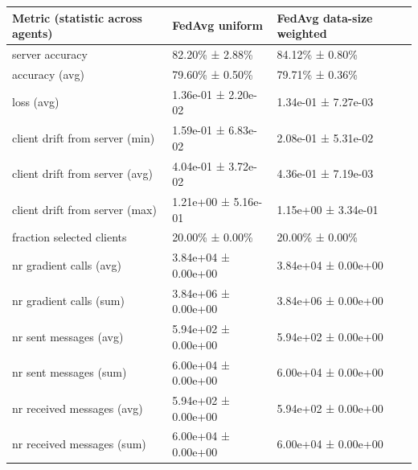\begin{tabular}{lll}
\hline
 Metric (statistic across agents)   & FedAvg uniform      & FedAvg data-size weighted   \\
\hline
 server accuracy                    & 82.20\% ± 2.88\%      & 84.12\% ± 0.80\%              \\
 accuracy (avg)                     & 79.60\% ± 0.50\%      & 79.71\% ± 0.36\%              \\
 loss (avg)                         & 1.36e-01 ± 2.20e-02 & 1.34e-01 ± 7.27e-03         \\
 client drift from server (min)     & 1.59e-01 ± 6.83e-02 & 2.08e-01 ± 5.31e-02         \\
 client drift from server (avg)     & 4.04e-01 ± 3.72e-02 & 4.36e-01 ± 7.19e-03         \\
 client drift from server (max)     & 1.21e+00 ± 5.16e-01 & 1.15e+00 ± 3.34e-01         \\
 fraction selected clients          & 20.00\% ± 0.00\%      & 20.00\% ± 0.00\%              \\
 nr gradient calls (avg)            & 3.84e+04 ± 0.00e+00 & 3.84e+04 ± 0.00e+00         \\
 nr gradient calls (sum)            & 3.84e+06 ± 0.00e+00 & 3.84e+06 ± 0.00e+00         \\
 nr sent messages (avg)             & 5.94e+02 ± 0.00e+00 & 5.94e+02 ± 0.00e+00         \\
 nr sent messages (sum)             & 6.00e+04 ± 0.00e+00 & 6.00e+04 ± 0.00e+00         \\
 nr received messages (avg)         & 5.94e+02 ± 0.00e+00 & 5.94e+02 ± 0.00e+00         \\
 nr received messages (sum)         & 6.00e+04 ± 0.00e+00 & 6.00e+04 ± 0.00e+00         \\
\hline
\end{tabular}